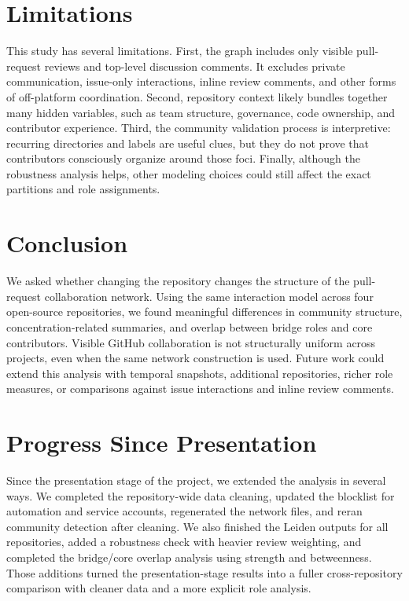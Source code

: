 \documentclass[11pt]{article}
\begin{document}
\section{Limitations}
This study has several limitations. First, the graph includes only visible pull-request reviews and top-level discussion comments. It excludes private communication, issue-only interactions, inline review comments, and other forms of off-platform coordination. Second, repository context likely bundles together many hidden variables, such as team structure, governance, code ownership, and contributor experience. Third, the community validation process is interpretive: recurring directories and labels are useful clues, but they do not prove that contributors consciously organize around those foci. Finally, although the robustness analysis helps, other modeling choices could still affect the exact partitions and role assignments.

\section{Conclusion}
We asked whether changing the repository changes the structure of the pull-request collaboration network. Using the same interaction model across four open-source repositories, we found meaningful differences in community structure, concentration-related summaries, and overlap between bridge roles and core contributors. Visible GitHub collaboration is not structurally uniform across projects, even when the same network construction is used. Future work could extend this analysis with temporal snapshots, additional repositories, richer role measures, or comparisons against issue interactions and inline review comments.

\section*{Progress Since Presentation}
Since the presentation stage of the project, we extended the analysis in several ways. We completed the repository-wide data cleaning, updated the blocklist for automation and service accounts, regenerated the network files, and reran community detection after cleaning. We also finished the Leiden outputs for all repositories, added a robustness check with heavier review weighting, and completed the bridge/core overlap analysis using strength and betweenness. Those additions turned the presentation-stage results into a fuller cross-repository comparison with cleaner data and a more explicit role analysis.
\end{document}
